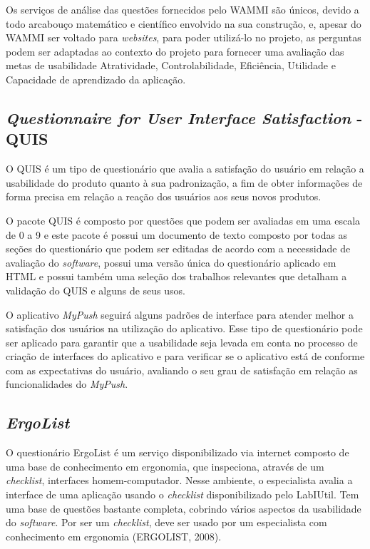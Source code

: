       Os serviços de análise das questões fornecidos pelo WAMMI são únicos, devido a todo arcabouço matemático e científico
      envolvido na sua construção, e, apesar do WAMMI ser voltado para \textit{websites}, para poder utilizá-lo no projeto, as perguntas
      podem ser adaptadas ao contexto do projeto para fornecer uma avaliação das metas de usabilidade Atratividade,
      Controlabilidade, Eficiência, Utilidade e Capacidade de aprendizado da aplicação.
    
    \subsection{\textit{Questionnaire for User Interface Satisfaction} - QUIS}
      
      \nocite{quis}
      O QUIS é um tipo de questionário que avalia a satisfação do usuário em relação a usabilidade do produto quanto à sua
      padronização, a fim de obter informações de forma precisa em relação a reação dos usuários aos seus novos produtos. 
      
      O pacote QUIS é composto por questões que podem ser avaliadas em uma escala de 0 a 9 e este pacote é possui um documento
      de texto composto por todas as seções do questionário que podem ser editadas de acordo com a necessidade de avaliação do 
      \textit{software}, possui uma versão única do questionário aplicado em HTML e possui também uma seleção dos trabalhos relevantes
      que detalham a validação do QUIS e alguns de seus usos. 
      
      O aplicativo \textit{MyPush} seguirá alguns padrões de interface para atender melhor a satisfação dos usuários na utilização do
      aplicativo. Esse tipo de questionário pode ser aplicado para garantir que a usabilidade seja levada em conta no processo de
      criação de interfaces do aplicativo e para verificar se o aplicativo está de conforme com as expectativas do usuário, 
      avaliando o seu grau de satisfação em relação as funcionalidades do \textit{MyPush}.
      
    \subsection{\textit{ErgoList}}
    
      O questionário ErgoList é um serviço disponibilizado via internet composto de uma base de conhecimento em ergonomia,
      que inspeciona, através de um \textit{checklist}, interfaces homem-computador. Nesse ambiente, o especialista avalia a interface 
      de uma aplicação usando o \textit{checklist} disponibilizado pelo LabIUtil. Tem uma base de questões bastante completa, cobrindo
      vários aspectos da usabilidade do \textit{software}. Por ser um \textit{checklist}, deve ser usado por um especialista com conhecimento em
      ergonomia (ERGOLIST, 2008).
      
